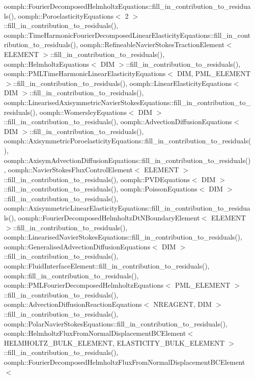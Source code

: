 oomph\+::\+Fourier\+Decomposed\+Helmholtz\+Equations\+::fill\+\_\+in\+\_\+contribution\+\_\+to\+\_\+residuals(), oomph\+::\+Poroelasticity\+Equations$<$ 2 $>$\+::fill\+\_\+in\+\_\+contribution\+\_\+to\+\_\+residuals(), oomph\+::\+Time\+Harmonic\+Fourier\+Decomposed\+Linear\+Elasticity\+Equations\+::fill\+\_\+in\+\_\+contribution\+\_\+to\+\_\+residuals(), oomph\+::\+Refineable\+Navier\+Stokes\+Traction\+Element$<$ E\+L\+E\+M\+E\+N\+T $>$\+::fill\+\_\+in\+\_\+contribution\+\_\+to\+\_\+residuals(), oomph\+::\+Helmholtz\+Equations$<$ D\+I\+M $>$\+::fill\+\_\+in\+\_\+contribution\+\_\+to\+\_\+residuals(), oomph\+::\+P\+M\+L\+Time\+Harmonic\+Linear\+Elasticity\+Equations$<$ D\+I\+M, P\+M\+L\+\_\+\+E\+L\+E\+M\+E\+N\+T $>$\+::fill\+\_\+in\+\_\+contribution\+\_\+to\+\_\+residuals(), oomph\+::\+Linear\+Elasticity\+Equations$<$ D\+I\+M $>$\+::fill\+\_\+in\+\_\+contribution\+\_\+to\+\_\+residuals(), oomph\+::\+Linearised\+Axisymmetric\+Navier\+Stokes\+Equations\+::fill\+\_\+in\+\_\+contribution\+\_\+to\+\_\+residuals(), oomph\+::\+Womersley\+Equations$<$ D\+I\+M $>$\+::fill\+\_\+in\+\_\+contribution\+\_\+to\+\_\+residuals(), oomph\+::\+Advection\+Diffusion\+Equations$<$ D\+I\+M $>$\+::fill\+\_\+in\+\_\+contribution\+\_\+to\+\_\+residuals(), oomph\+::\+Axisymmetric\+Poroelasticity\+Equations\+::fill\+\_\+in\+\_\+contribution\+\_\+to\+\_\+residuals(), oomph\+::\+Axisym\+Advection\+Diffusion\+Equations\+::fill\+\_\+in\+\_\+contribution\+\_\+to\+\_\+residuals(), oomph\+::\+Navier\+Stokes\+Flux\+Control\+Element$<$ E\+L\+E\+M\+E\+N\+T $>$\+::fill\+\_\+in\+\_\+contribution\+\_\+to\+\_\+residuals(), oomph\+::\+P\+V\+D\+Equations$<$ D\+I\+M $>$\+::fill\+\_\+in\+\_\+contribution\+\_\+to\+\_\+residuals(), oomph\+::\+Poisson\+Equations$<$ D\+I\+M $>$\+::fill\+\_\+in\+\_\+contribution\+\_\+to\+\_\+residuals(), oomph\+::\+Axisymmetric\+Linear\+Elasticity\+Equations\+::fill\+\_\+in\+\_\+contribution\+\_\+to\+\_\+residuals(), oomph\+::\+Fourier\+Decomposed\+Helmholtz\+Dt\+N\+Boundary\+Element$<$ E\+L\+E\+M\+E\+N\+T $>$\+::fill\+\_\+in\+\_\+contribution\+\_\+to\+\_\+residuals(), oomph\+::\+Linearised\+Navier\+Stokes\+Equations\+::fill\+\_\+in\+\_\+contribution\+\_\+to\+\_\+residuals(), oomph\+::\+Generalised\+Advection\+Diffusion\+Equations$<$ D\+I\+M $>$\+::fill\+\_\+in\+\_\+contribution\+\_\+to\+\_\+residuals(), oomph\+::\+Fluid\+Interface\+Element\+::fill\+\_\+in\+\_\+contribution\+\_\+to\+\_\+residuals(), oomph\+::fill\+\_\+in\+\_\+contribution\+\_\+to\+\_\+residuals(), oomph\+::\+P\+M\+L\+Fourier\+Decomposed\+Helmholtz\+Equations$<$ P\+M\+L\+\_\+\+E\+L\+E\+M\+E\+N\+T $>$\+::fill\+\_\+in\+\_\+contribution\+\_\+to\+\_\+residuals(), oomph\+::\+Advection\+Diffusion\+Reaction\+Equations$<$ N\+R\+E\+A\+G\+E\+N\+T, D\+I\+M $>$\+::fill\+\_\+in\+\_\+contribution\+\_\+to\+\_\+residuals(), oomph\+::\+Polar\+Navier\+Stokes\+Equations\+::fill\+\_\+in\+\_\+contribution\+\_\+to\+\_\+residuals(), oomph\+::\+Helmholtz\+Flux\+From\+Normal\+Displacement\+B\+C\+Element$<$ H\+E\+L\+M\+H\+O\+L\+T\+Z\+\_\+\+B\+U\+L\+K\+\_\+\+E\+L\+E\+M\+E\+N\+T, E\+L\+A\+S\+T\+I\+C\+I\+T\+Y\+\_\+\+B\+U\+L\+K\+\_\+\+E\+L\+E\+M\+E\+N\+T $>$\+::fill\+\_\+in\+\_\+contribution\+\_\+to\+\_\+residuals(), oomph\+::\+Fourier\+Decomposed\+Helmholtz\+Flux\+From\+Normal\+Displacement\+B\+C\+Element$<$ 